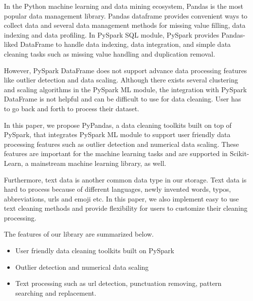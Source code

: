 \documentclass[sigconf]{acmart}
\begin{document}
In the Python machine learning and data mining ecosystem, Pandas\cite{pandas} is the most popular data management library. Pandas dataframe provides convenient ways to collect data and several data management methods for missing value filling, data indexing and data profiling. In PySpark SQL module, PySpark provides Pandas-liked DataFrame to handle data indexing, data integration, and simple data cleaning tasks such as missing value handling and duplication removal.
	
However, PySpark DataFrame does not support advance data processing features like outlier detection and data scaling. Although there exists several clustering and scaling algorithms in the PySpark ML module, the integration with PySpark DataFrame is not helpful and can be difficult to use for data cleaning. User has to go back and forth to process their dataset.  

In this paper, we propose PyPandas, a data cleaning toolkits built on top of PySpark, that integrates PySpark ML module to support user friendly data processing features such as outlier detection and numerical data scaling. These features are important for the machine learning tasks and are supported in Scikit-Learn\cite{scikit-learn}, a mainstream machine learning library, as well.
	
Furthermore, text data is another common data type in our storage. Text data is hard to process because of different languages, newly invented words, typos, abbreviations, urls and emoji etc.  In this paper, we also implement easy to use text cleaning methods and provide flexibility for users to customize their cleaning processing. 
	
The features of our library are summarized below.
\begin{itemize}
	\item{User friendly data cleaning toolkits built on PySpark}
	\item{Outlier detection and numerical data scaling}
	\item{Text processing such as url detection, punctuation removing, pattern searching and replacement. }
\end{itemize}	
\end{document}
